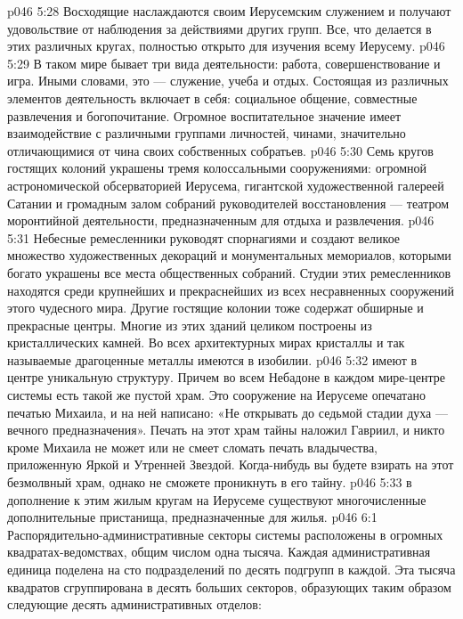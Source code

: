 \vs p046 5:28 Восходящие наслаждаются своим Иерусемским служением и получают удовольствие от наблюдения за действиями других групп. Все, что делается в этих различных кругах, полностью открыто для изучения всему Иерусему.
\vs p046 5:29 В таком мире бывает три вида деятельности: работа, совершенствование и игра. Иными словами, это --- служение, учеба и отдых. Состоящая из различных элементов деятельность включает в себя: социальное общение, совместные развлечения и богопочитание. Огромное воспитательное значение имеет взаимодействие с различными группами личностей, чинами, значительно отличающимися от чина своих собственных собратьев.
\vs p046 5:30 \pc {}\bibnobreakspace {} Семь кругов гостящих колоний украшены тремя колоссальными сооружениями: огромной астрономической обсерваторией Иерусема, гигантской художественной галереей Сатании и громадным залом собраний руководителей восстановления --- театром моронтийной деятельности, предназначенным для отдыха и развлечения.
\vs p046 5:31 Небесные ремесленники руководят спорнагиями и создают великое множество художественных декораций и монументальных мемориалов, которыми богато украшены все места общественных собраний. Студии этих ремесленников находятся среди крупнейших и прекраснейших из всех несравненных сооружений этого чудесного мира. Другие гостящие колонии тоже содержат обширные и прекрасные центры. Многие из этих зданий целиком построены из кристаллических камней. Во всех архитектурных мирах кристаллы и так называемые драгоценные металлы имеются в изобилии.
\vs p046 5:32 \pc {}\bibnobreakspace {} имеют в центре уникальную структуру. Причем во всем Небадоне в каждом мире\hyp{}центре системы есть такой же пустой храм. Это сооружение на Иерусеме опечатано печатью Михаила, и на ней написано: «Не открывать до седьмой стадии духа --- вечного предназначения». Печать на этот храм тайны наложил Гавриил, и никто кроме Михаила не может или не смеет сломать печать владычества, приложенную Яркой и Утренней Звездой. Когда\hyp{}нибудь вы будете взирать на этот безмолвный храм, однако не сможете проникнуть в его тайну.
\vs p046 5:33 \pc {} в дополнение к этим жилым кругам на Иерусеме существуют многочисленные дополнительные пристанища, предназначенные для жилья.
\vs p046 6:1 Распорядительно\hyp{}административные секторы системы расположены в огромных квадратах\hyp{}ведомствах, общим числом одна тысяча. Каждая административная единица поделена на сто подразделений по десять подгрупп в каждой. Эта тысяча квадратов сгруппирована в десять больших секторов, образующих таким образом следующие десять административных отделов:
